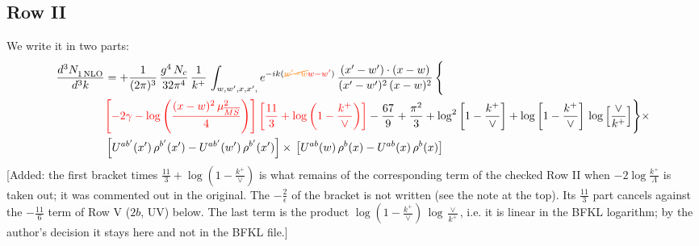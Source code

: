 \documentclass[9pt]{article}
\numberwithin{equation}{section}
\begin{document}
\subsection{Row II}
We write it in two parts:
\begin{align}
     \frac{d^{3}N_{1\,\rm NLO}^{\rm}}{d^{3}k} &  =  +\frac{1}{(2\pi)^{3}}\, \frac{g^{4}\,N_{c}}{32\pi^{4}}\,\frac{1}{k^{+}}\, \int_{w, w',x,x',} e^{-ik({\color{orange}\cancel{w^\prime-w}}{\color{red}w-w^\prime})}\, \frac{(x'-w')\cdot (x-w)}{(x'-w')^{2}\, (x-w)^{2}}\, \Bigg\{ \notag \\ & {\color{red}\left[-2\gamma-\log{\left(\frac{(x-w)^{2}\,\mu^{2}_{\overline{MS}}}{4}\right)}\right]\left[\frac{11}{3}+\log{\left(1-\frac{k^{+}}{\vee}\right)}\right]}-\frac{67}{9}+\frac{\pi^{2}}{3}+\log^{2}{\left[1-\frac{k^{+}}{\vee}\right]}+\log{\left[1-\frac{k^{+}}{\vee}\right]}\,\log{\left[\frac{\vee}{k^{+}}\right]}\Bigg\}\times\notag \\ & \left[U^{ab'}(x')\,\rho^{b'}(x') - U^{ab'}(w')\,\rho^{b'}(x')\right]\times\,\left[U^{ab}(w)\,\rho^{b}(x) - U^{ab}(x)\,\rho^{b}(x)\right]
\end{align} {\color{red}[Added: the first bracket times $\frac{11}{3}+\log(1-\frac{k^{+}}{\vee})$ is what remains of the corresponding term of the checked Row II when $-2\log\frac{k^{+}}{\Lambda}$ is taken out; it was commented out in the original. The $-\frac{2}{\epsilon}$ of the bracket is not written (see the note at the top). Its $\frac{11}{3}$ part cancels against the $-\frac{11}{6}$ term of Row V ($2b$, UV) below. The last term is the product $\log(1-\frac{k^{+}}{\vee})\,\log\frac{\vee}{k^{+}}$, i.e. it is linear in the BFKL logarithm; by the author's decision it stays here and not in the BFKL file.]}\par\noindent  
\end{document}
